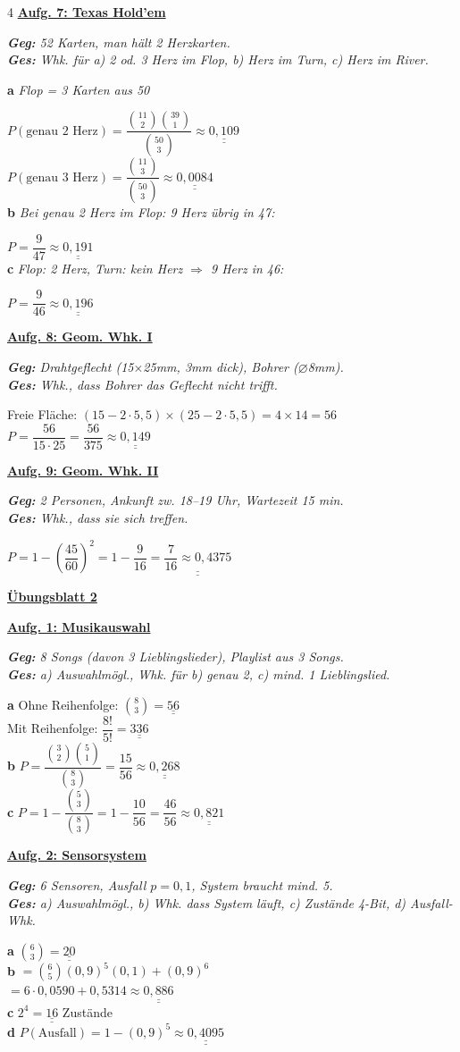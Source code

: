 \documentclass[landscape,a4paper,8pt]{article}
\newcommand{\aufgabe}[1]{\vspace{1pt}\textbf{\underline{#1}}\par}
\newcommand{\blatt}[1]{\smallskip\begin{center}\textbf{\normalsize\underline{#1}}\end{center}\par}
\newcommand{\teil}[1]{\textbf{#1}\;}
\newcommand{\erkl}[1]{{\small\textit{#1}}\par}
\newcommand{\erg}[1]{\underline{\underline{#1}}}
\begin{document}
\begin{multicols*}{4}
\aufgabe{Aufg. 7: Texas Hold'em}
\erkl{\textbf{Geg:} 52 Karten, man hält 2 Herzkarten.\\\textbf{Ges:} Whk. für a) 2 od. 3 Herz im Flop, b) Herz im Turn, c) Herz im River.}
\teil{a} \erkl{Flop = 3 Karten aus 50}
$P(\text{genau 2 Herz})=\dfrac{\binom{11}{2}\binom{39}{1}}{\binom{50}{3}}\approx\erg{0{,}109}$\\
$P(\text{genau 3 Herz})=\dfrac{\binom{11}{3}}{\binom{50}{3}}\approx\erg{0{,}0084}$\\
\teil{b} \erkl{Bei genau 2 Herz im Flop: 9 Herz übrig in 47:}
$P=\dfrac{9}{47}\approx\erg{0{,}191}$\\
\teil{c} \erkl{Flop: 2 Herz, Turn: kein Herz $\Rightarrow$ 9 Herz in 46:}
$P=\dfrac{9}{46}\approx\erg{0{,}196}$

\aufgabe{Aufg. 8: Geom. Whk. I}
\erkl{\textbf{Geg:} Drahtgeflecht (15$\times$25mm, 3mm dick), Bohrer ($\varnothing$8mm).\\\textbf{Ges:} Whk., dass Bohrer das Geflecht nicht trifft.}
Freie Fläche: $(15-2\cdot5{,}5)\times(25-2\cdot5{,}5)=4\times14=56$\\
$P=\dfrac{56}{15\cdot25}=\dfrac{56}{375}\approx\erg{0{,}149}$

\aufgabe{Aufg. 9: Geom. Whk. II}
\erkl{\textbf{Geg:} 2 Personen, Ankunft zw. 18–19 Uhr, Wartezeit 15 min.\\\textbf{Ges:} Whk., dass sie sich treffen.}
$P=1-\left(\dfrac{45}{60}\right)^2=1-\dfrac{9}{16}=\erg{\dfrac{7}{16}\approx0{,}4375}$


\blatt{Übungsblatt 2}

\aufgabe{Aufg. 1: Musikauswahl}
\erkl{\textbf{Geg:} 8 Songs (davon 3 Lieblingslieder), Playlist aus 3 Songs.\\\textbf{Ges:} a) Auswahlmögl., Whk. für b) genau 2, c) mind. 1 Lieblingslied.}
\teil{a} Ohne Reihenfolge: $\binom{8}{3}=\erg{56}$\\
Mit Reihenfolge: $\dfrac{8!}{5!}=\erg{336}$\\
\teil{b} $P=\dfrac{\binom{3}{2}\binom{5}{1}}{\binom{8}{3}}=\dfrac{15}{56}\approx\erg{0{,}268}$\\
\teil{c} $P=1-\dfrac{\binom{5}{3}}{\binom{8}{3}}=1-\dfrac{10}{56}=\dfrac{46}{56}\approx\erg{0{,}821}$

\aufgabe{Aufg. 2: Sensorsystem}
\erkl{\textbf{Geg:} 6 Sensoren, Ausfall $p=0{,}1$, System braucht mind. 5.\\\textbf{Ges:} a) Auswahlmögl., b) Whk. dass System läuft, c) Zustände 4-Bit, d) Ausfall-Whk.}
\teil{a} $\binom{6}{3}=\erg{20}$\\
\teil{b} $=\binom{6}{5}(0{,}9)^5(0{,}1)+(0{,}9)^6$\\
$=6\cdot0{,}0590+0{,}5314\approx\erg{0{,}886}$\\
\teil{c} $2^4=\erg{16}$ Zustände\\
\teil{d} $P(\text{Ausfall})=1-(0{,}9)^5\approx\erg{0{,}4095}$


\end{multicols*}
\end{document}
